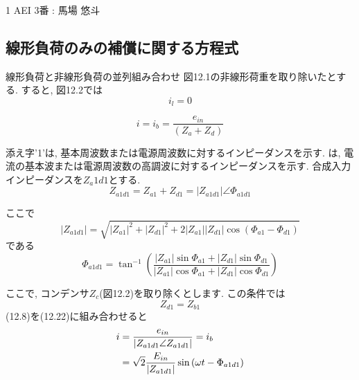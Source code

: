 \documentclass[fleqn,11pt,a4paper,dvipdfmx]{jsarticle}
\numberwithin{equation}{section}
\begin{document}
%
%
1 AEI 3番 : 馬場 悠斗
\setcounter{section}{12}
\subsection{線形負荷のみの補償に関する方程式}

線形負荷と非線形負荷の並列組み合わせ
図12.1の非線形荷重を取り除いたとする. 
すると, 図12.2では
\begin{equation}
  i_l = 0
\end{equation}

\begin{equation}
  i = i_b = \frac{e_{in}}{\left(Z_a + Z_d\right)}
\end{equation}

添え字'1'は, 基本周波数または電源周波数に対するインピーダンスを示す. 
は, 電流の基本波または電源周波数の高調波に対するインピーダンスを示す. 
合成入力インピーダンスを$Z_a1d1$とする. 
\begin{equation}
  Z_{a1d1} = Z_{a1} + Z_{d1} = |Z_{a1d1}| \angle \Phi_{a1d1}
\end{equation}

ここで
\begin{equation}
  |Z_{a1d1}| = \sqrt{|Z_{a1}|^2 + |Z_{d1}|^2 + 2|Z_{a1}||Z_{d1}| \cos \left(\Phi_{a1} - \Phi_{d1}\right) }
\end{equation}
である
\begin{equation}
  \Phi_{a1d1} = \tan^{-1}\left( \frac{\left| Z_{a1} \right| \sin \Phi_{a1} + \left| Z_{d1} \right| \sin \Phi_{d1} }{\left| Z_{a1} \right| \cos \Phi_{a1} + \left| Z_{d1} \right| \cos \Phi_{d1}}\right)
\end{equation}

ここで, コンデンサ$Z_c$(図12.2)を取り除くとします. 
この条件では
\begin{equation}
  Z_{d1} = Z_{b1}
\end{equation}
(12.8)を(12.22)に組み合わせると
\begin{align}
  i & = \frac{e_{in}}{\left| Z_{a1d1}\angle Z_{a1d1} \right|} = i_b \notag                     \\
    & = \sqrt{2} \frac{E_{in}}{\left|Z_{a1d1}\right|} \sin \left(\omega t - \Phi_{a1d1}\right)
\end{align}
\end{document}
